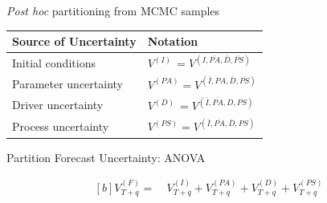 \documentclass[12pt, compress, aspectratio=1610]{beamer}
\begin{document}
\begin{frame}{%
\protect\hypertarget{partitioning-from-mcmc-samples-6}{%
\emph{Post hoc} partitioning from MCMC samples}}

\begin{longtable}[]{@{}ll@{}}
\toprule
\begin{minipage}[b]{0.29\columnwidth}\raggedright
Source of Uncertainty\strut
\end{minipage} & \begin{minipage}[b]{0.25\columnwidth}\raggedright
Notation\strut
\end{minipage}\tabularnewline
\midrule
\endhead
\begin{minipage}[t]{0.29\columnwidth}\raggedright
Initial conditions\strut
\end{minipage} & \begin{minipage}[t]{0.25\columnwidth}\raggedright
\(V^{(I) \ } = V^{(I,\overline{PA},\overline{D},\overline{PS})}\)\strut
\end{minipage}\tabularnewline
\begin{minipage}[t]{0.29\columnwidth}\raggedright
Parameter uncertainty\strut
\end{minipage} & \begin{minipage}[t]{0.25\columnwidth}\raggedright
\(V^{(PA)} = V^{(\overline{I},PA,\overline{D},\overline{PS})}\)\strut
\end{minipage}\tabularnewline
\begin{minipage}[t]{0.29\columnwidth}\raggedright
Driver uncertainty\strut
\end{minipage} & \begin{minipage}[t]{0.25\columnwidth}\raggedright
\(V^{(D) \ } = V^{(\overline{I},\overline{PA},D,\overline{PS})}\)\strut
\end{minipage}\tabularnewline
\begin{minipage}[t]{0.29\columnwidth}\raggedright
Process uncertainty\strut
\end{minipage} & \begin{minipage}[t]{0.25\columnwidth}\raggedright
\(V^{(PS)}=V^{(\overline{I},\overline{PA},\overline{D},PS)}\)\strut
\end{minipage}\tabularnewline
\bottomrule
\end{longtable}

\end{frame}

\begin{frame}{%
\protect\hypertarget{partition-forecast-uncertainty-anova}{%
Partition Forecast Uncertainty: ANOVA}}

\begin{equation*}
\begin{aligned}[b]
V_{T+q}^{(F)} = \ &V_{T+q}^{(I)} + V_{T+q}^{(PA)} + V_{T+q}^{(D)} + V_{T+q}^{(PS)}
\end{aligned}
\end{equation*}

\end{frame}
\end{document}
